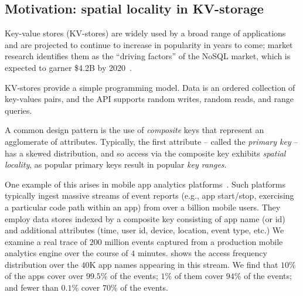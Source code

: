 \subsection{Motivation:  spatial locality in KV-storage}

Key-value stores (KV-stores) are widely used  by a broad range of applications and are projected
to continue to increase in popularity in years to come; market research  identifies them as the 
``driving factors'' of the NoSQL market, which is expected to garner \$4.2B by 2020~\cite{alliedmarketresearch}.

KV-stores provide a simple programming model. 
Data is an ordered collection of key-values pairs, and  the API supports random writes, 
random reads, and range queries. 

A common design pattern is the use of \emph{composite} keys that represent an agglomerate of attributes.
Typically, the first attribute -- called the \emph{primary key} -- has a skewed distribution, and so   access via the composite key exhibits \emph{spatial locality}, as 
popular primary keys result in popular \emph{key ranges}. 

One example of this arises in mobile app analytics platforms~\cite{medium-mobile-analytics}.   
Such platforms typically ingest massive streams of event reports (e.g., app start/stop,  exercising a particular code path within an app) from over a billion mobile users.  
They employ data stores indexed by a composite key consisting of  app name (or id) and additional attributes (time, user id, device, location, event type, etc.) 
We examine a real trace of  $200$ million events captured from a production mobile analytics engine over the course of $4$ minutes.  
 shows the access frequency distribution over the  $40$K app names appearing in this stream. 
We find that $10$\% of the apps cover over $99.5$\% of the events; $1$\% of them  cover $94$\% of the events; and fewer than $0.1$\% cover $70$\% of the events. 


